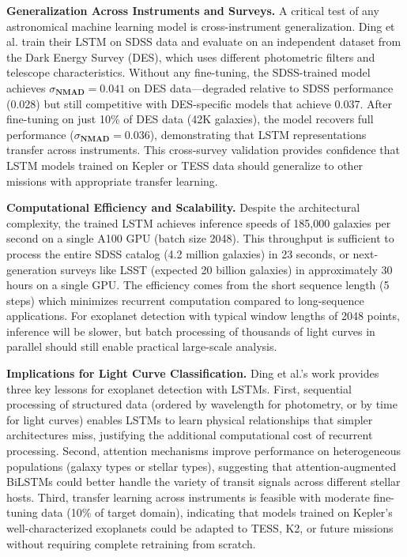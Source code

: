\documentclass[letterpaper]{article} %
\begin{document}
\textbf{Generalization Across Instruments and Surveys.} A critical test of any astronomical machine learning model is cross-instrument generalization. Ding et al. train their LSTM on SDSS data and evaluate on an independent dataset from the Dark Energy Survey (DES), which uses different photometric filters and telescope characteristics. Without any fine-tuning, the SDSS-trained model achieves $\sigma_
\textbf{NMAD} = 0.041$ on DES data—degraded relative to SDSS performance (0.028) but still competitive with DES-specific models that achieve 0.037. After fine-tuning on just 10\% of DES data (42K galaxies), the model recovers full performance ($\sigma_
\textbf{NMAD} = 0.036$), demonstrating that LSTM representations transfer across instruments. This cross-survey validation provides confidence that LSTM models trained on Kepler or TESS data should generalize to other missions with appropriate transfer learning.

\textbf{Computational Efficiency and Scalability.} Despite the architectural complexity, the trained LSTM achieves inference speeds of 185,000 galaxies per second on a single A100 GPU (batch size 2048). This throughput is sufficient to process the entire SDSS catalog (4.2 million galaxies) in 23 seconds, or next-generation surveys like LSST (expected 20 billion galaxies) in approximately 30 hours on a single GPU. The efficiency comes from the short sequence length (5 steps) which minimizes recurrent computation compared to long-sequence applications. For exoplanet detection with typical window lengths of 2048 points, inference will be slower, but batch processing of thousands of light curves in parallel should still enable practical large-scale analysis.

\textbf{Implications for Light Curve Classification.} Ding et al.'s work provides three key lessons for exoplanet detection with LSTMs. First, sequential processing of structured data (ordered by wavelength for photometry, or by time for light curves) enables LSTMs to learn physical relationships that simpler architectures miss, justifying the additional computational cost of recurrent processing. Second, attention mechanisms improve performance on  heterogeneous populations (galaxy types or stellar types), suggesting that attention-augmented BiLSTMs could better handle the variety of transit signals across different stellar hosts. Third, transfer learning across instruments is feasible with moderate fine-tuning data (10\% of target domain), indicating that models trained on Kepler's well-characterized exoplanets could be adapted to TESS, K2, or future missions without requiring complete retraining from scratch.
\end{document}
